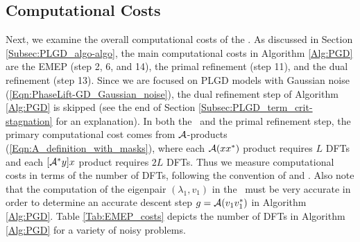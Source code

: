 \subsection{Computational Costs} 	\label{Subsubsec:evol_mats-EMEP_compu_costs}


Next, we examine the overall computational costs of the \emep.
As discussed in Section \ref{Subsec:PLGD_algo-algo}, the main computational costs in Algorithm \ref{Alg:PGD} are the EMEP (step 2, 6, and 14), the primal refinement (step 11), and the dual refinement (step 13).  
Since we are focused on PLGD models with Gaussian noise (\ref{Eqn:PhaseLift-GD_Gaussian_noise}), the dual refinement step of Algorithm \ref{Alg:PGD} is skipped (see the end of Section \ref{Subsec:PLGD_term_crit-stagnation} for an explanation).
In both the \emep \ and the primal refinement step, the primary computational cost comes from ${\mathcal A}$-products (\ref{Eqn:A_definition_with_masks}), where each ${\mathcal A}(xx^*)$ product requires $L$ DFTs and each $[{\mathcal A}^*y]x$ product requires $2L$ DFTs.  
Thus we measure computational costs in terms of the number of DFTs, following the convention of \cite{DBLP:journals/tit/CandesLS15} and \cite{DBLP:journals/siamsc/FriedlanderM16}.
Also note that the computation of the eigenpair $(\lambda_1, v_1)$ in the \emep \ must be very accurate in order to determine an accurate descent step $g = {\mathcal A}(v_1v_1^*)$ in Algorithm \ref{Alg:PGD}.
Table \ref{Tab:EMEP_costs} depicts the number of DFTs in Algorithm \ref{Alg:PGD} for a variety of noisy problems.
